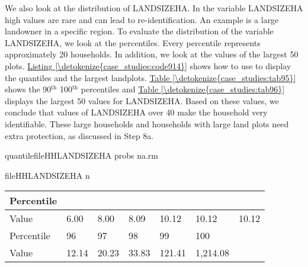 \documentclass[letterpaper,10pt,english]{sphinxmanual}
\begin{document}
We also look at the distribution of LANDSIZEHA. In the variable
LANDSIZEHA high values are rare and can lead to re-identification. An
example is a large landowner in a specific region. To evaluate the
distribution of the variable LANDSIZEHA, we look at the percentiles.
Every percentile represents approximately 20 households. In addition, we
look at the values of the largest 50 plots. \hyperref[\detokenize{case_studies:code914}]{Listing \ref{\detokenize{case_studies:code914}}} shows how to
use  to display the quantiles and the largest landplots. \hyperref[\detokenize{case_studies:tab95}]{Table \ref{\detokenize{case_studies:tab95}}}
shows the 90$^{\text{th}}$ \textendash{} 100$^{\text{th}}$ percentiles and \hyperref[\detokenize{case_studies:tab96}]{Table \ref{\detokenize{case_studies:tab96}}}
displays the largest 50 values for LANDSIZEHA. Based on these values, we
conclude that values of LANDSIZEHA over 40 make the household very
identifiable. These large households and households with large land
plots need extra protection, as discussed in Step 8a.

\def\sphinxLiteralBlockLabel{\label{\detokenize{case_studies:code914}}}
%
\begin{sphinxVerbatim}[commandchars=\\\{\},numbers=left,firstnumber=1,stepnumber=1]
quantilefileHHLANDSIZEHA probs   na.rm 

fileHHLANDSIZEHA n  
\end{sphinxVerbatim}


\begin{savenotes}\sphinxattablestart
\centering
{}
\label{\detokenize{case_studies:tab95}}\label{\detokenize{case_studies:id19}}
\sphinxaftercaption
\begin{tabulary}{\linewidth}[t]{|T|T|T|T|T|T|T|}
\hline
\sphinxstyletheadfamily 
Percentile
&
&
&
&
&
&
\\
\hline
Value
&
6.00
&
8.00
&
8.09
&
10.12
&
10.12
&
10.12
\\
\hline
Percentile
&
96
&
97
&
98
&
99
&
100
&\\
\hline
Value
&
12.14
&
20.23
&
33.83
&
121.41
&
1,214.08
&\\
\hline
\end{tabulary}
\par
\sphinxattableend\end{savenotes}
\end{document}
